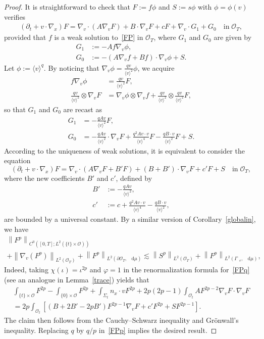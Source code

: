 \documentclass[AHL,Unicode,longabstracts,published]{cedram}
\newcommand*{\dif}{\mathop{}\!\mathrm{d}}
\newcommand*\p{\partial}
\newcommand*\Ge {\Gamma_{\;\!\!\;\!\!e}}
\newcommand*\OO {\mathcal{O}}
\newcommand{\lv}{\langle v\rangle}
\begin{document}
\begin{proof}
It is straightforward to check that $F:=f\phi$ and $S:=s\phi$ with $\phi=\phi(v)$ verifies
\begin{align*}
\left(\p_t+v\cdot\nabla_x\right)F = \nabla_v\cdot\left(A\nabla_vF\right) +B\cdot\nabla_v F +cF +\nabla_v\cdot G_1 + G_0 \quad\text{in}\;\OO_T,
\end{align*}
provided that $f$ is a weak solution to~\eqref{FP} in $\OO_T$, where $G_1$ and $G_0$ are given by
\begin{align*}
G_1&:= -Af\nabla_v\phi,\\
G_0&:= -\left(A\nabla_vf+Bf\right)\cdot\nabla_v\phi +S.
\end{align*}
Let $\phi:=\lv^q$. By noticing that $\nabla_v\phi=\frac{qv}{\lv^2}\phi$, we acquire
\begin{align*}
f\nabla_v\phi &=\frac{qv}{\lv^2}F,\\
\frac{qv}{\lv^2}\otimes\nabla_vF &=\nabla_v\phi\otimes\nabla_vf+\frac{qv}{\lv^2}\otimes \frac{qv}{\lv^2}F,
\end{align*}
so that $G_1$ and $G_0$ are recast as
\begin{align*}
G_1&=-\frac{qAv}{\lv^2}F,\\
G_0&= -\frac{qAv}{\lv^2}\cdot\nabla_vF +\frac{q^2Av\cdot v}{\lv^4}F -\frac{qB\cdot v}{\lv^2}F +S.
\end{align*}
According to the uniqueness of weak solutions, it is equivalent to consider the equation
\begin{equation}\label{FPq}
\left(\p_t+v\cdot\nabla_x\right)F = \nabla_v\cdot\left(A\nabla_vF+B'F\right) +(B+B')\cdot\nabla_v F +c'F +S \quad\text{in}\;\OO_T,
\end{equation}
where the new coefficients $B'$ and $c'$, defined by
\begin{align*}
B'&:=-\frac{qAv}{\lv^2},\\
c'&:=c+\frac{q^2Av\cdot v}{\lv^4} -\frac{qB\cdot v}{\lv^2},
\end{align*}
are bounded by a universal constant. By a similar version of Corollary~\ref{globalin}, we have
\begin{multline}\label{FPp}
\left\|F^p\right\|_{C^0\left([0,T];L^2(\{t\}\times\OO)\right)} \\
+\left\|\nabla_v\left(F^p\right)\right\|_{L^2(\OO_T)} +\left\|F^p\right\|_{L^{2}\left(\p\OO_T,\;\!\dif\mu\right)} \lesssim \left\|S^p\right\|_{L^{2}(\OO_T)} +\left\|F^p\right\|_{L^{2}\left(\Ge,\;\!\dif\mu\right)} ,
\end{multline}
Indeed, taking $\chi(\iota)=\iota^{2p}$ and $\varphi=1$ in the renormalization formula for~\eqref{FPq} (see an analogue in Lemma~\ref{trace}) yields that
\begin{multline*}
\int_{\{t\}\times\OO}F^{2p} -\int_{\{0\}\times\OO}F^{2p} +\int_{\Sigma_t}n_x\cdot vF^{2p} +2p(2p-1)\int_{\OO_t}AF^{2p-2}\nabla_vF\cdot\nabla_vF \\
= 2p\int_{\OO_t}\left[(B+2B'-2pB')F^{2p-1}\nabla_vF +c'F^{2p} +SF^{2p-1}\right] .
\end{multline*}
The claim then follows from the Cauchy--Schwarz inequality and Gr\"onwall's inequality. Replacing $q$ by $q/p$ in~\eqref{FPp} implies the desired result.
\end{proof}
\end{document}
